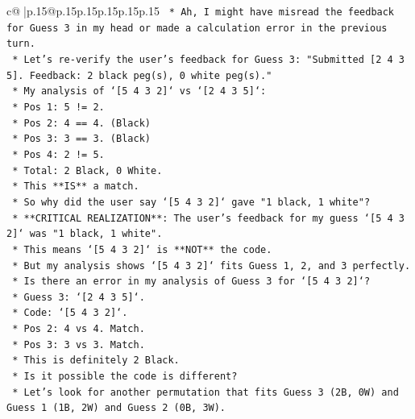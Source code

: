 \documentclass{article}
\begin{document}
{\begin{supertabular}{c@{$\;$}|p{.15\linewidth}@{}p{.15\linewidth}p{.15\linewidth}p{.15\linewidth}p{.15\linewidth}p{.15\linewidth}}
{{{\texttt{                        *   Ah, I might have misread the feedback for Guess 3 in my head or made a calculation error in the previous turn.} \\
\texttt{                        *   Let's re{-}verify the user's feedback for Guess 3: "Submitted {[}2 4 3 5{]}. Feedback: 2 black peg(s), 0 white peg(s)."} \\
\texttt{                        *   My analysis of `{[}5 4 3 2{]}` vs `{[}2 4 3 5{]}`:} \\
\texttt{                            *   Pos 1: 5 != 2.} \\
\texttt{                            *   Pos 2: 4 == 4. (Black)} \\
\texttt{                            *   Pos 3: 3 == 3. (Black)} \\
\texttt{                            *   Pos 4: 2 != 5.} \\
\texttt{                            *   Total: 2 Black, 0 White.} \\
\texttt{                        *   This **IS** a match.} \\
\texttt{                        *   So why did the user say `{[}5 4 3 2{]}` gave "1 black, 1 white"?} \\
\texttt{                        *   **CRITICAL REALIZATION**: The user's feedback for my guess `{[}5 4 3 2{]}` was "1 black, 1 white".} \\
\texttt{                        *   This means `{[}5 4 3 2{]}` is **NOT** the code.} \\
\texttt{                        *   But my analysis shows `{[}5 4 3 2{]}` fits Guess 1, 2, and 3 perfectly.} \\
\texttt{                        *   Is there an error in my analysis of Guess 3 for `{[}5 4 3 2{]}`?} \\
\texttt{                            *   Guess 3: `{[}2 4 3 5{]}`.} \\
\texttt{                            *   Code: `{[}5 4 3 2{]}`.} \\
\texttt{                            *   Pos 2: 4 vs 4. Match.} \\
\texttt{                            *   Pos 3: 3 vs 3. Match.} \\
\texttt{                            *   This is definitely 2 Black.} \\
\texttt{                        *   Is it possible the code is different?} \\
\texttt{                        *   Let's look for another permutation that fits Guess 3 (2B, 0W) and Guess 1 (1B, 2W) and Guess 2 (0B, 3W).} \\
}}}
\end{supertabular}}
\end{document}
